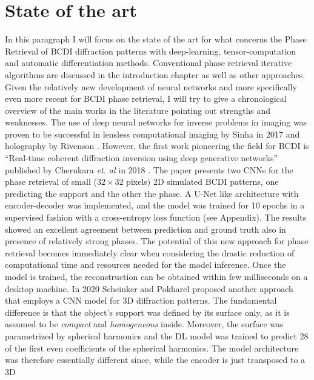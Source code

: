 \newpage

\section{State of the art}\label{chp:phasing_stateart}
In this paragraph I will focus on the state of the art for what concerns the Phase Retrieval of BCDI diffraction patterns with
deep-learning, tensor-computation and automatic differentiation methods. Conventional phase retrieval iterative algorithms 
are discussed in the introduction chapter as well as other approaches. \\
Given the relatively new development of neural networks and more specifically even more recent for BCDI phase retrieval, I will try
to give a chronological overview of the main works in the literature pointing out strengths and weaknesses.
The use of deep neural networks for inverse problems in imaging was proven to be successful in lensless computational 
imaging by Sinha in 2017 \cite{Sinha:17} and holography by Rivenson \cite{Rivenson2018}.
However, the first work pioneering the field for BCDI is ``Real-time coherent diffraction inversion using deep generative networks'' published
by Cherukara \textit{et. al} in 2018 \cite{cherukara_real-time_2018}. The paper presents two CNNs for the phase retrieval of small ($32\times32$ pixels) 2D 
simulated BCDI patterns, one predicting the support and the other the phase. A U-Net like architecture with 
encoder-decoder was implemented, and the model was trained for 10 epochs in a supervised fashion with a cross-entropy loss function (see Appendix).
The results showed an excellent agreement between prediction and ground truth also in presence of relatively strong phases. 
The potential of this new approach for phase retrieval becomes immediately clear when considering the drastic reduction of
computational time and resources needed for the model inference. Once the model is trained, the reconstruction can be obtained
within few milliseconds on a desktop machine. In 2020 Scheinker and Pokharel proposed another approach \cite{scheinker_adaptive_2020}
that employs a CNN model for 3D diffraction patterns. The fundamental difference is that the object's support was defined 
by its surface only, as it is assumed to be \textit{compact} and \textit{homogeneous} inside. Moreover, the surface was
parametrized by spherical harmonics and the DL model was trained to predict 28 of the first even coefficients of the spherical
harmonics. The model architecture was therefore essentially different since, while the encoder is just transposed to a 3D 
